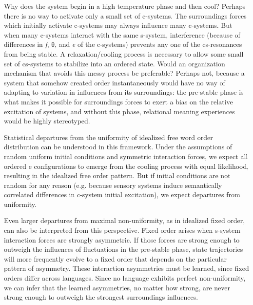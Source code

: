   Why does the system begin in a high temperature phase and then cool? Perhaps there is no way to activate only a small set of c-systems. The surroundings forces which initially activate c-systems may always influence many c-systems. But when many c-systems interact with the same s-system, interference (because of differences in \textit{f}, θ, and \textit{e} of the c-systems) prevents any one of the cs-resonances from being stable. A relaxation/cooling process is necessary to allow some small set of cs-systems to stabilize into an ordered state. Would an organization mechanism that avoids this messy process be preferable? Perhaps not, because a system that somehow created order instantaneously would have no way of adapting to variation in influences from its surroundings: the pre-stable phase is what makes it possible for surroundings forces to exert a bias on the relative excitation of systems, and without this phase, relational meaning experiences would be highly stereotyped.

Statistical departures from the uniformity of idealized free word order distribution can be understood in this framework. Under the assumptions of random uniform initial conditions and symmetric interaction forces, we expect all ordered e configurations to emerge from the cooling process with equal likelihood, resulting in the idealized free order pattern. But if initial conditions are not random for any reason (e.g. because sensory systems induce semantically correlated differences in c-system initial excitation), we expect departures from uniformity.

  Even larger departures from maximal non-uniformity, as in idealized fixed order, can also be interpreted from this perspective. Fixed order arises when s-system interaction forces are strongly asymmetric. If those forces are strong enough to outweigh the influences of fluctuations in the pre-stable phase, state trajectories will more frequently evolve to a fixed order that depends on the particular pattern of asymmetry. These interaction asymmetries must be learned, since fixed orders differ across languages. Since no language exhibits perfect non-uniformity, we can infer that the learned asymmetries, no matter how strong, are never strong enough to outweigh the strongest surroundings influences.

